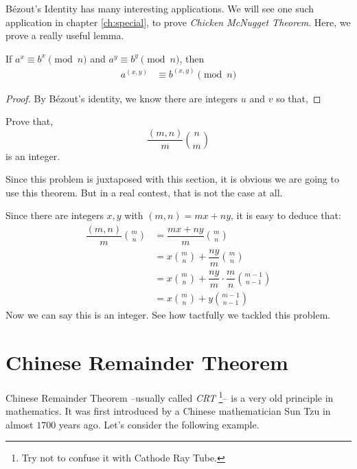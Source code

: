 \documentclass{subfile}
\begin{document}
	
	B\'{e}zout's Identity has many interesting applications. We will see one such application in chapter \eqref{ch:special}, to prove \textit{Chicken McNugget Theorem}. Here, we prove a really useful lemma.
	
	\begin{theorem}
		If $a^x\equiv b^x\pmod n$ and $a^y\equiv b^y\pmod n$, then	
		\begin{align*}
		a^{(x,y)} & \equiv b^{(x,y)}\pmod n
		\end{align*}\label{thm:modgcd}
	\end{theorem}
	
	\begin{proof}
		By B\'{e}zout's identity, we know there are integers $u$ and $v$ so that,
		
	\end{proof}
	
	\begin{problem}
		Prove that, $$\dfrac{(m,n)}{m}\binom{n}{m}$$ is an integer.
	\end{problem}
	Since this problem is juxtaposed with this section, it is obvious we are going to use this theorem. But in a real contest, that is not the case at all.
	\begin{solution}
		Since there are integers $x,y$ with $(m,n)=mx+ny$, it is easy to deduce that:
		\begin{align*}
		\dfrac{(m,n)}{m}\binom{m}{n} & = \dfrac{mx+ny}{m}\binom{m}{n}\\
		& = x\binom{m}{n}+\dfrac{ny}{m}\binom{m}{n}\\
		& = x\binom{m}{n}+\dfrac{ny}{m}\cdot\dfrac{m}{n}\binom{m-1}{n-1}\\
		& = x\binom{m}{n}+y\binom{m-1}{n-1}
		\end{align*}
		Now we can say this is an integer. See how tactfully we tackled this problem.
	\end{solution}
\section{Chinese Remainder Theorem}	
	Chinese Remainder Theorem --usually called \textit{CRT} \footnote{Try not to confuse it with Cathode Ray Tube.}-- is a very old principle in mathematics. It was first introduced by a Chinese mathematician Sun Tzu in almost $1700$ years ago. Let's consider the following example.
	
\end{document}
